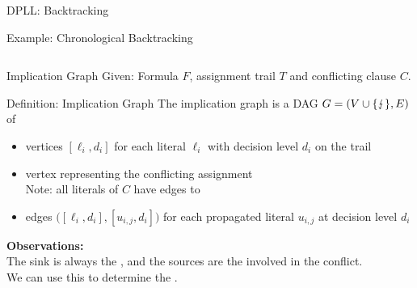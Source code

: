 \documentclass[t]{sdqbeamer}
\begin{document}
\begin{frame}{DPLL: Backtracking}
\begin{exampleblock}{Example: Chronological Backtracking}
\begin{columns}[T]
\begin{column}{.45\textwidth}
\end{column}
\end{columns}
\end{exampleblock}
\end{frame}


\begin{frame}{Implication Graph}
Given: Formula $F$, assignment trail $T$ and conflicting clause $C$.

\begin{block}{Definition: Implication Graph}
The implication graph is a DAG $G=(V \cup \{ \text{\ensuremath{\lightning}} \},E)$ of \\[1ex]
\begin{itemize}\setlength{\itemsep}{1em}
	\item vertices $[\ell_i,d_i]$ for each literal $\ell_i$ with decision level $d_i$ on the trail
	\item vertex \blitz{} representing the conflicting assignment\\[1ex] Note: all literals of $C$ have edges to \blitz{}
	\item edges $\bigl([\ell_i, d_i], [u_{i,j}, d_i]\bigr)$ for each propagated literal $u_{i,j}$ at decision level $d_i$
\end{itemize}
\end{block}
\textbf{Observations:}\\[1ex]
The sink is always the , and the sources are the  involved in the conflict.\\[1ex]
We can use this to determine the .
\end{frame}
\end{document}

